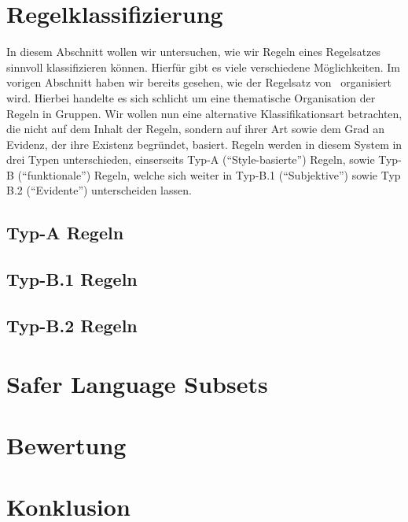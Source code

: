 \documentclass[a4paper,UKenglish,cleveref, autoref]{templates/lipics-v2019}
\begin{document}
\section{Regelklassifizierung}
\label{sec:regelklassifizierung}
In diesem Abschnitt wollen wir untersuchen, wie wir Regeln eines Regelsatzes sinnvoll klassifizieren können.
Hierfür gibt es viele verschiedene Möglichkeiten.
Im vorigen Abschnitt haben wir bereits gesehen, wie der Regelsatz von \misra\ organisiert wird.
Hierbei handelte es sich schlicht um eine thematische Organisation der Regeln in Gruppen.
Wir wollen nun eine alternative Klassifikationsart betrachten, die nicht auf dem Inhalt der Regeln, sondern auf ihrer
Art sowie dem Grad an Evidenz, der ihre Existenz begründet, basiert.
Regeln werden in diesem System in drei Typen unterschieden,  einserseits Typ-A (\enquote{Style-basierte}) Regeln,
sowie Typ-B (\enquote{funktionale}) Regeln, welche sich weiter in Typ-B.1 (\enquote{Subjektive}) sowie
Typ B.2 (\enquote{Evidente}) unterscheiden lassen.\cite{hatton2004safer}

\subsection{Typ-A Regeln}
\label{subsec:typ-a-regeln}

\subsection{Typ-B.1 Regeln}
\label{subsec:typ-b-1-regeln}

\subsection{Typ-B.2 Regeln}
\label{subsec:typ-b-2-regeln}

\section{Safer Language Subsets}
\label{sec:safer-language-subsets}

\section{Bewertung}
\label{sec:bewertung}

\section{Konklusion}
\label{sec:konklusion}




\end{document}
